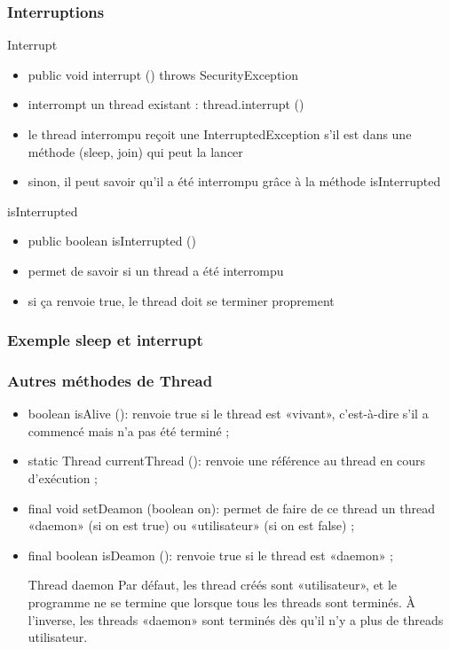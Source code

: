 \documentclass{beamer}
\begin{document}
\begin{frame}
  \frametitle{Interruptions}
  \begin{block}{Interrupt}
    \begin{itemize}
    \item public void interrupt () throws SecurityException
    \item interrompt un thread existant : thread.interrupt ()
    \item le thread interrompu reçoit une InterruptedException s'il
      est dans une méthode (sleep, join) qui peut la lancer
    \item sinon, il peut savoir qu'il a été interrompu grâce à la
      méthode isInterrupted
    \end{itemize}
  \end{block}
  \begin{block}{isInterrupted}
    \begin{itemize}
    \item public boolean isInterrupted ()
    \item permet de savoir si un thread a été interrompu
    \item si ça renvoie true, le thread doit se terminer proprement
    \end{itemize}
  \end{block}
\end{frame}
\begin{frame}
  \frametitle{Exemple sleep et interrupt}
  
\end{frame}

\begin{frame}
  \frametitle{Autres méthodes de Thread}
  \begin{itemize}
  \item boolean isAlive (): renvoie true si le thread est «vivant»,
    c'est-à-dire s'il a commencé mais n'a pas été terminé ;
  \item static Thread currentThread (): renvoie une référence au
    thread en cours d'exécution ;
  \item final void setDeamon (boolean on): permet de faire de ce
    thread un thread «daemon» (si on est true) ou «utilisateur» (si on
    est false) ;
  \item final boolean isDeamon (): renvoie true si le thread est «daemon» ;
    \begin{block}{Thread daemon}
      Par défaut, les thread créés sont «utilisateur», et le programme ne
      se termine que lorsque tous les threads sont terminés. À
      l'inverse, les threads «daemon» sont terminés dès qu'il n'y a
      plus de threads utilisateur.
    \end{block}
  \end{itemize}
\end{frame}
\end{document}
